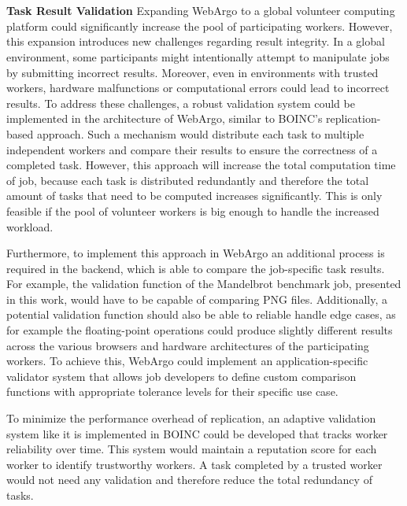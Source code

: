 \\~\\
\textbf{Task Result Validation}
\newline
Expanding WebArgo to a global volunteer computing platform could significantly increase the pool of participating workers. However, this expansion introduces new challenges regarding result integrity. In a global environment, some participants might intentionally attempt to manipulate jobs by submitting incorrect results. Moreover, even in environments with trusted workers, hardware malfunctions or computational errors could lead to incorrect results. To address these challenges, a robust validation system could be implemented in the architecture of WebArgo, similar to \ac{BOINC}'s replication-based approach. Such a mechanism would distribute each task to multiple independent workers and compare their results to ensure the correctness of a completed task. However, this approach will increase the total computation time of job, because each task is distributed redundantly and therefore the total amount of tasks that need to be computed increases significantly. This is only feasible if the pool of volunteer workers is big enough to handle the increased workload.

Furthermore, to implement this approach in WebArgo an additional process is required in the backend, which is able to compare the job-specific task results. For example, the validation function of the Mandelbrot benchmark job, presented in this work, would have to be capable of comparing \acs{PNG} files. Additionally, a potential validation function should also be able to reliable handle edge cases, as for example the floating-point operations could produce slightly different results across the various browsers and hardware architectures of the participating workers. To achieve this, WebArgo could implement an application-specific validator system that allows job developers to define custom comparison functions with appropriate tolerance levels for their specific use case.   

To minimize the performance overhead of replication, an adaptive validation system like it is implemented in \ac{BOINC} could be developed that tracks worker reliability over time. This system would maintain a reputation score for each worker to identify trustworthy workers. A task completed by a trusted worker would not need any validation and therefore reduce the total redundancy of tasks. 


